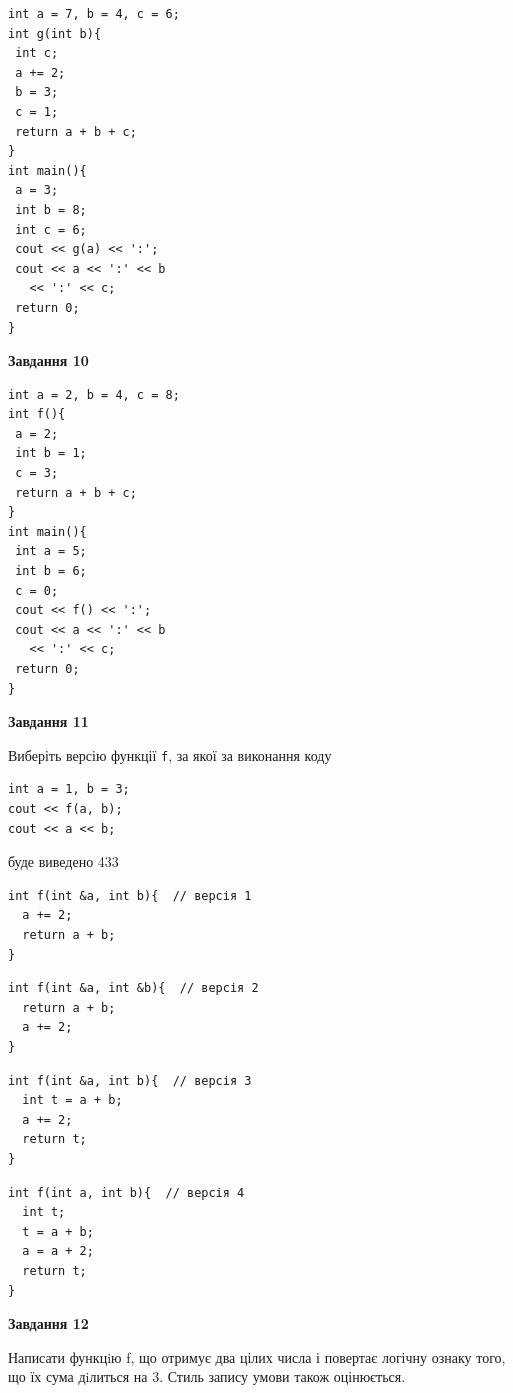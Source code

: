 \documentclass[12pt, ukrainian]{article}
\def\code#1{\Verb!#1!}
\begin{document}
{\begin {large}
\begin{minipage}[t]{7.0cm}
\begin{verbatim}
int a = 7, b = 4, c = 6;
int g(int b){
 int c;
 a += 2;
 b = 3;
 c = 1;
 return a + b + c;
}
int main(){
 a = 3;
 int b = 8;
 int c = 6;
 cout << g(a) << ':';
 cout << a << ':' << b 
   << ':' << c;
 return 0;
}
\end{verbatim}



\begin{center}
\textbf{Завдання 10}
\end{center}
\vspace{-8mm}

\begin{verbatim}
int a = 2, b = 4, c = 8;
int f(){
 a = 2;
 int b = 1;
 c = 3;
 return a + b + c;
}
int main(){
 int a = 5;
 int b = 6;
 c = 0;
 cout << f() << ':';
 cout << a << ':' << b 
   << ':' << c;
 return 0;
}
\end{verbatim}

\end{minipage}
\vline \hspace{1mm}
\begin{minipage}[t]{11.0cm}

\begin{center}
\textbf{Завдання 11}
\end{center}
Виберіть версію функції \code{f}, за якої за виконання коду
\begin{verbatim}
int a = 1, b = 3;
cout << f(a, b);
cout << a << b;
\end{verbatim}

буде виведено 433

\begin{verbatim}
int f(int &a, int b){  // версія 1
  a += 2;
  return a + b;
}
\end{verbatim}

\vspace{-8mm}\begin{verbatim}
int f(int &a, int &b){  // версія 2
  return a + b;
  a += 2;
}
\end{verbatim}

\vspace{-8mm}\begin{verbatim}
int f(int &a, int b){  // версія 3
  int t = a + b;
  a += 2;
  return t;
}
\end{verbatim}

\vspace{-8mm}\begin{verbatim}
int f(int a, int b){  // версія 4
  int t;
  t = a + b;
  a = a + 2;
  return t;
}
\end{verbatim}



\begin{center}
\textbf{Завдання 12}
\end{center}

Написати функцiю f, що отримує два цілих числа і повертає логічну ознаку того, що їх сума дiлиться на 3. Стиль запису умови також оцінюється.\par

\end{minipage}

\end {large}}
\newpage
\end{document}
